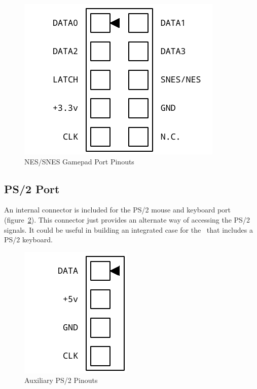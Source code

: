 \begin{figure}[ht]
    \begin{center}
        \includegraphics[scale=0.75]{images/f256_port_nes.pdf}
    \end{center}
    \caption{NES/SNES Gamepad Port Pinouts}
    \label{fig:port_nes}
\end{figure}

\subsection*{PS/2 Port}

An internal connector is included for the PS/2 mouse and keyboard port (figure~\ref{fig:port_ps2}). This connector just provides an alternate way of accessing the PS/2 signals. It could be useful in building an integrated case for the \jr\ that includes a PS/2 keyboard.

\begin{figure}[ht]
    \begin{center}
        \includegraphics[scale=0.75]{images/f256_port_ps2.pdf}
    \end{center}
    \caption{Auxiliary PS/2 Pinouts}
    \label{fig:port_ps2}
\end{figure}

